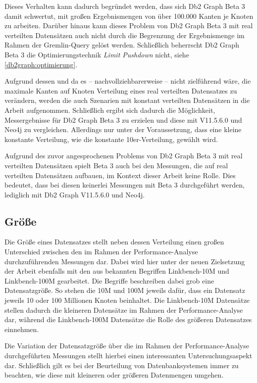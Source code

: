 Dieses Verhalten kann dadurch begründet werden, dass sich Db2 Graph Beta 3 damit schwertut, mit großen Ergebnismengen von über 100.000 Kanten je Knoten zu arbeiten. Darüber hinaus kann dieses Problem von Db2 Graph Beta 3 mit real verteilten Datensätzen auch nicht durch die Begrenzung der Ergebnismenge im Rahmen der Gremlin-Query gelöst werden. Schließlich beherrscht Db2 Graph Beta 3 die Optimierungstechnik \textit{Limit Pushdown} nicht, siehe \autoref{db2graph:optimierung}. 

Aufgrund dessen und da es -- nachvollziehbarerweise -- nicht zielführend wäre, die maximale Kanten auf Knoten Verteilung eines real verteilten Datensatzes zu verändern, werden die auch Szenarien mit konstant verteilten Datensätzen in die Arbeit aufgenommen. Schließlich ergibt sich dadurch die Möglichkeit, Messergebnisse für Db2 Graph Beta 3 zu erzielen und diese mit V11.5.6.0 und Neo4j zu vergleichen. Allerdings nur unter der Voraussetzung, dass eine kleine konstante Verteilung, wie die konstante 10er-Verteilung, gewählt wird. 

Aufgrund des zuvor angesprochenen Problems von Db2 Graph Beta 3 mit real verteilten Datensätzen spielt Beta 3 auch bei den Messungen, die auf real verteilten Datensätzen aufbauen, im Kontext dieser Arbeit keine Rolle. Dies bedeutet, dass bei diesen keinerlei Messungen mit Beta 3 durchgeführt werden, lediglich mit Db2 Graph V11.5.6.0 und Neo4j. 

\subsection{Größe}
Die Größe eines Datensatzes stellt neben dessen Verteilung einen großen Unterschied zwischen den im Rahmen der Performance-Analyse durchzuführenden Messungen dar. Dabei wird hier unter der neuen Zielsetzung der Arbeit ebenfalls mit den aus \cite{sigmod_tian} bekannten Begriffen Linkbench-10M und Linkbench-100M gearbeitet. Die Begriffe beschreiben dabei grob eine Datensatzgröße. So stehen die 10M und 100M jeweils dafür, dass ein Datensatz jeweils 10 oder 100 Millionen Knoten beinhaltet. Die Linkbench-10M Datensätze stellen dadurch die kleineren Datensätze im Rahmen der Performance-Analyse dar, während die Linkbench-100M Datensätze die Rolle des größeren Datensatzes einnehmen. 

Die Variation der Datensatzgröße über die im Rahmen der Performance-Analyse durchgeführten Messungen stellt hierbei einen interessanten Untersuchungsaspekt dar. Schließlich gilt es bei der Beurteilung von Datenbanksystemen immer zu beachten, wie diese mit kleineren oder größeren Datenmengen umgehen.

